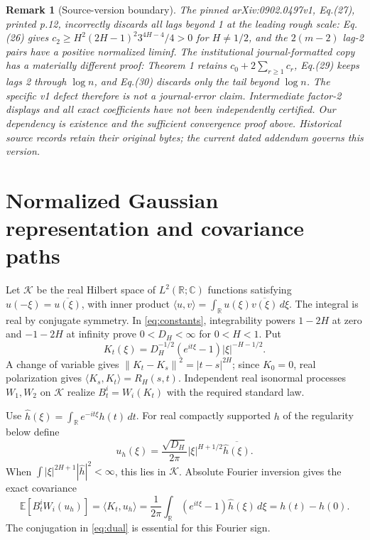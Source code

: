 \documentclass[11pt]{article}
\newtheorem{remark}{Remark}
\newcommand{\E}{\mathbb E}
\newcommand{\R}{\mathbb R}
\newcommand{\K}{\mathcal K}
\newcommand{\norm}[1]{\left\lVert#1\right\rVert}
\begin{document}
\begin{remark}[Source-version boundary]
The pinned arXiv:0902.0497v1, Eq.(27), printed p.12, incorrectly discards \emph{all} lags beyond 1 at the leading rough scale: Eq.(26) gives
$c_2\ge H^2(2H-1)^2 3^{4H-4}/4>0$ for $H\ne1/2$, and the $2(m-2)$ lag-2 pairs have a positive normalized liminf. The institutional \emph{journal-formatted} copy has a materially different proof: Theorem 1 retains $c_0+2\sum_{r\ge1}c_r$, Eq.(29) keeps lags 2 through $\log n$, and Eq.(30) discards only the tail beyond $\log n$. The specific v1 defect therefore is not a journal-error claim. Intermediate factor-2 displays and all exact coefficients have not been independently certified. Our dependency is existence and the sufficient convergence proof above. Historical source records retain their original bytes; the current dated addendum governs this version.
\end{remark}

\section{Normalized Gaussian representation and covariance paths}
Let $\K$ be the real Hilbert space of $L^2(\R;\mathbb C)$ functions satisfying $u(-\xi)=\overline{u(\xi)}$, with inner product
$\langle u,v\rangle=\int_{\R}u(\xi)\overline{v(\xi)}\,d\xi$.
The integral is real by conjugate symmetry. In \eqref{eq:constants}, integrability powers $1-2H$ at zero and $-1-2H$ at infinity prove $0<D_H<\infty$ for $0<H<1$.
Put
\[
K_t(\xi)=D_H^{-1/2}(e^{it\xi}-1)|\xi|^{-H-1/2}.
\]
A change of variable gives $\norm{K_t-K_s}^2=|t-s|^{2H}$; since $K_0=0$, real polarization gives $\langle K_s,K_t\rangle=R_H(s,t)$. Independent real isonormal processes $W_1,W_2$ on $\K$ realize $B^i_t=W_i(K_t)$ with the required standard law.

Use $\widehat h(\xi)=\int_{\R}e^{-it\xi}h(t)\,dt$. For real compactly supported $h$ of the regularity below define
\begin{equation}
u_h(\xi)=\frac{\sqrt{D_H}}{2\pi}|\xi|^{H+1/2}
\overline{\widehat h(\xi)}.\label{eq:dual}
\end{equation}
When $\int|\xi|^{2H+1}|\widehat h|^2<\infty$, this lies in $\K$. Absolute Fourier inversion gives the exact covariance
\begin{equation}
\E[B^i_tW_i(u_h)]=\langle K_t,u_h\rangle
=\frac1{2\pi}\int_{\R}(e^{it\xi}-1)\widehat h(\xi)\,d\xi
=h(t)-h(0).\label{eq:covpath}
\end{equation}
The conjugation in \eqref{eq:dual} is essential for this Fourier sign.
\end{document}
